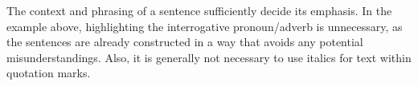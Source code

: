 


\noindent The context and phrasing of a sentence sufficiently decide its emphasis.
In the example above, highlighting the interrogative pronoun/adverb is unnecessary, as the sentences are already constructed in a way that avoids any potential misunderstandings.
Also, it is generally not necessary to use italics for text within quotation marks.
